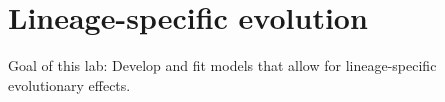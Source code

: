 \chapter{Lineage-specific evolution}

Goal of this lab:
Develop and fit models that allow for lineage-specific evolutionary effects.

